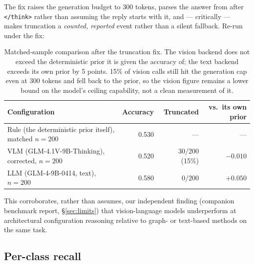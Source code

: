 \documentclass[11pt,a4paper]{article}
\begin{document}
The fix raises the generation budget to 300 tokens, parses the answer from
after \texttt{</think>} rather than assuming the reply starts with it, and ---
critically --- makes truncation a \emph{counted, reported} event rather than a
silent fallback. Re-run under the fix:

\begin{table}[h]
\centering
\small
\begin{tabular}{@{}lrrr@{}}
\toprule
\textbf{Configuration} & \textbf{Accuracy} & \textbf{Truncated} &
\textbf{vs.\ its own prior} \\
\midrule
Rule (the deterministic prior itself), matched $n{=}200$
  & 0.530 & --- & --- \\
VLM (GLM-4.1V-9B-Thinking), corrected, $n{=}200$
  & 0.520 & 30/200 (15\%) & $-0.010$ \\
LLM (GLM-4-9B-0414, text), $n{=}200$ & 0.580 & 0/200 & $+0.050$ \\
\bottomrule
\end{tabular}
\caption{Matched-sample comparison after the truncation fix. The vision
backend does not exceed the deterministic prior it is given the accuracy of;
the text backend exceeds its own prior by 5 points. 15\% of vision calls still
hit the generation cap even at 300 tokens and fell back to the prior, so the
vision figure remains a lower bound on the model's ceiling capability, not a
clean measurement of it.}
\label{tab:vlm}
\end{table}

This corroborates, rather than assumes, our independent finding (companion
benchmark report, \S\ref{sec:limits}) that vision-language models underperform
at architectural configuration reasoning relative to graph- or text-based
methods on the same task.

\subsection{Per-class recall}
\end{document}
